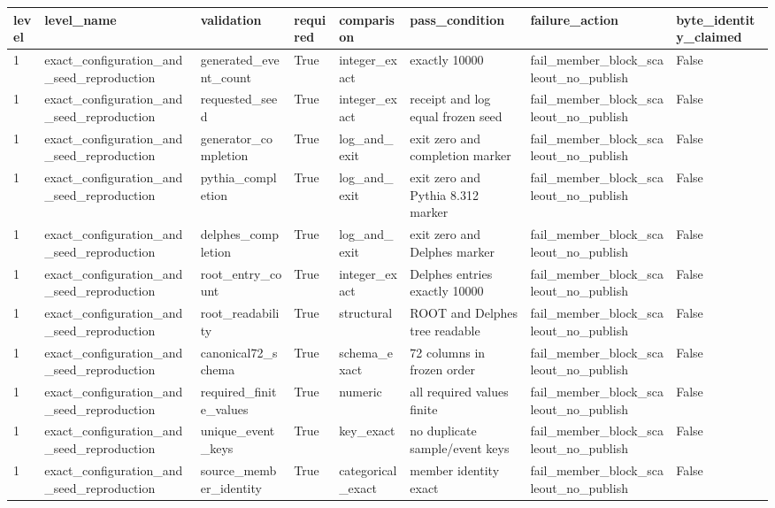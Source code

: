 \begin{tabular}{llllllll}
\toprule
level & level\_name & validation & required & comparison & pass\_condition & failure\_action & byte\_identity\_claimed \\
\midrule
1 & exact\_configuration\_and\_seed\_reproduction & generated\_event\_count & True & integer\_exact & exactly 10000 & fail\_member\_block\_scaleout\_no\_publish & False \\
1 & exact\_configuration\_and\_seed\_reproduction & requested\_seed & True & integer\_exact & receipt and log equal frozen seed & fail\_member\_block\_scaleout\_no\_publish & False \\
1 & exact\_configuration\_and\_seed\_reproduction & generator\_completion & True & log\_and\_exit & exit zero and completion marker & fail\_member\_block\_scaleout\_no\_publish & False \\
1 & exact\_configuration\_and\_seed\_reproduction & pythia\_completion & True & log\_and\_exit & exit zero and Pythia 8.312 marker & fail\_member\_block\_scaleout\_no\_publish & False \\
1 & exact\_configuration\_and\_seed\_reproduction & delphes\_completion & True & log\_and\_exit & exit zero and Delphes marker & fail\_member\_block\_scaleout\_no\_publish & False \\
1 & exact\_configuration\_and\_seed\_reproduction & root\_entry\_count & True & integer\_exact & Delphes entries exactly 10000 & fail\_member\_block\_scaleout\_no\_publish & False \\
1 & exact\_configuration\_and\_seed\_reproduction & root\_readability & True & structural & ROOT and Delphes tree readable & fail\_member\_block\_scaleout\_no\_publish & False \\
1 & exact\_configuration\_and\_seed\_reproduction & canonical72\_schema & True & schema\_exact & 72 columns in frozen order & fail\_member\_block\_scaleout\_no\_publish & False \\
1 & exact\_configuration\_and\_seed\_reproduction & required\_finite\_values & True & numeric & all required values finite & fail\_member\_block\_scaleout\_no\_publish & False \\
1 & exact\_configuration\_and\_seed\_reproduction & unique\_event\_keys & True & key\_exact & no duplicate sample/event keys & fail\_member\_block\_scaleout\_no\_publish & False \\
1 & exact\_configuration\_and\_seed\_reproduction & source\_member\_identity & True & categorical\_exact & member identity exact & fail\_member\_block\_scaleout\_no\_publish & False \\

\end{tabular}

